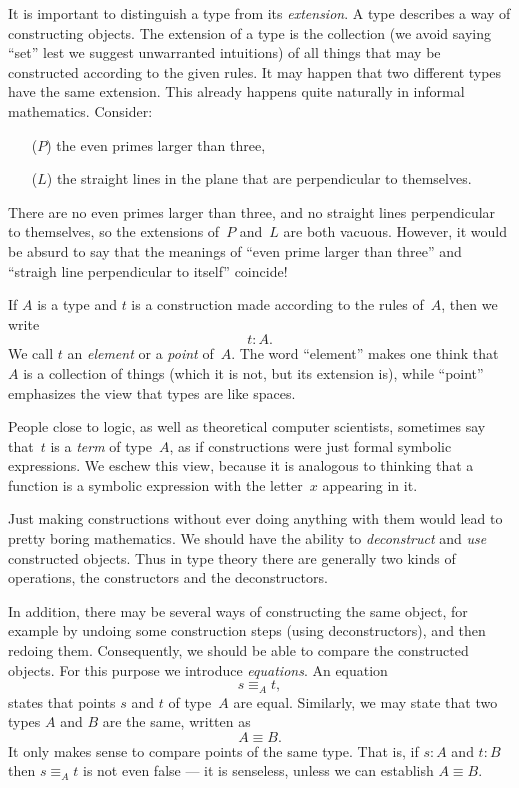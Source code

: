 \documentclass{article}
\begin{document}
It is important to distinguish a type from its \emph{extension}. A type
describes a way of constructing objects. The extension of a type is the
collection (we avoid saying ``set'' lest we suggest unwarranted intuitions) of
all things that may be constructed according to the given rules. It may happen
that two different types have the same extension. This already happens quite
naturally in informal mathematics. Consider:
%
\begin{enumerate}
\item[($P$)] the even primes larger than three,
\item[($L$)] the straight lines in the plane that are perpendicular to themselves.
\end{enumerate}
%
There are no even primes larger than three, and no straight lines perpendicular
to themselves, so the extensions of~$P$ and~$L$ are both vacuous. However, it
would be absurd to say that the meanings of ``even prime larger than three'' and
``straigh line perpendicular to itself'' coincide!

If $A$ is a type and $t$ is a construction made according to the rules of~$A$,
then we write
%
\begin{equation*}
  t : A.
\end{equation*}
%
We call $t$ an \emph{element} or a \emph{point} of~$A$. The word ``element''
makes one think that~$A$ is a collection of things (which it is not, but its
extension is), while ``point'' emphasizes the view that types are like spaces.

People close to logic, as well as theoretical computer scientists, sometimes say
that~$t$ is a \emph{term} of type~$A$, as if constructions were just formal
symbolic expressions. We eschew this view, because it is analogous to thinking
that a function is a symbolic expression with the letter~$x$ appearing in it.

Just making constructions without ever doing anything with them would lead to
pretty boring mathematics. We should have the ability to \emph{deconstruct} and
\emph{use} constructed objects. Thus in type theory there are generally two
kinds of operations, the constructors and the deconstructors.

In addition, there may be several ways of constructing the same object, for
example by undoing some construction steps (using deconstructors), and then
redoing them. Consequently, we should be able to compare the constructed
objects. For this purpose we introduce \emph{equations}. An equation
%
\begin{equation*}
  s \equiv_A t,
\end{equation*}
%
states that points $s$ and $t$ of type~$A$ are equal.
%
Similarly, we may state that two types $A$ and $B$ are the same, written as
%
\begin{equation*}
  A \equiv B.
\end{equation*}
%
It only makes sense to compare points of the same type. That is, if $s : A$ and
$t : B$ then $s \equiv_A t$ is not even false --- it is senseless, unless we can
establish $A \equiv B$.
\end{document}
